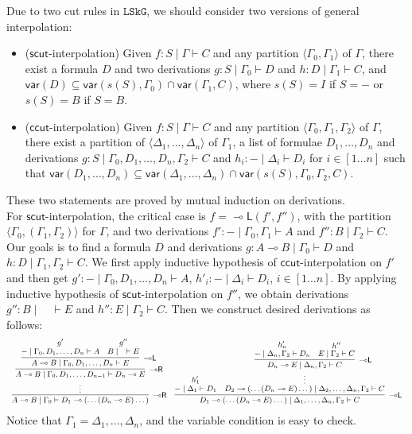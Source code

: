 \documentclass[submission,copyright,creativecommons]{eptcs}
\theoremstyle{definition}
\newcommand{\GG}{\Gamma}
\newcommand{\GD}{\Delta}
\newcommand{\lolli}{\multimap}
\newcommand{\lleft}{{\lolli}\mathsf{L}}
\newcommand{\lright}{{\lolli}\mathsf{R}}
\newcommand{\vdG}{\vdash}
\newcommand{\LSkG}{$\mathtt{LSkG}$}
\newcommand{\mf}[1]{\mathsf{#1}}
\newcommand{\vars}[1]{\mathsf{var}(#1)}
\begin{document}
Due to two cut rules in \LSkG, we should consider two versions of general interpolation:
\begin{itemize}
  \item[\ ] ($\mf{scut}$-interpolation) Given $f: S \mid \Gamma \vdG C$ and any partition $\langle \GG_0,\GG_1 \rangle$ of $\GG$, there exist a formula $D$ and two derivations $g : S \mid \GG_0 \vdG D$ and $h : D \mid \GG_1 \vdG C$, and $\vars{D} \subseteq \vars{s(S), \GG_0} \cap \vars{\GG_1, C}$, where $s(S) = I$ if $S = {-}$ or $s(S) = B$ if $S = B$.
  \item[\ ] ($\mf{ccut}$-interpolation) Given $f: S \mid \Gamma \vdG C$ and any partition $\langle \GG_0,\GG_1, \GG_2 \rangle$ of $\GG$, there exist a partition of $\langle \GD_1, \dots, \GD_n \rangle$ of $\GG_1$, a list of formulae $D_1, \dots, D_n$ and derivations $g: S \mid \GG_0, D_1, \dots, D_n, \GG_2 \vdG C$ and $h_i : {-} \mid \GD_i \vdG D_i$ for $i \in [1\dots n]$ such that $\vars{D_1, \dots, D_n} \subseteq \vars{\GD_1, \dots, \GD_n} \cap \vars{s(S), \GG_0, \GG_2, C}$.
\end{itemize}
These two statements are proved by mutual induction on derivations.
\\
For $\mf{scut}$-interpolation, the critical case is $f = \lleft (f',f'')$, with the partition $\langle \GG_0, (\GG_1, \GG_2) \rangle$ for $\GG$, and two derivations $f' : {-} \mid \GG_0, \GG_1 \vdG A$ and $f'': B \mid \GG_2 \vdG C$.
Our goals is to find a formula $D$ and derivations $g : A\lolli B \mid \GG_0 \vdG D$ and $h: D \mid \GG_1, \GG_2 \vdG C$.
We first apply inductive hypothesis of $\mf{ccut}$-interpolation on $f'$ and then get $g': {-} \mid \GG_0 , D_1, \dots, D_n \vdG A$, $h'_i : {-} \mid \GD_i \vdG D_i$, $i \in [1\dots n]$.
By applying inductive hypothesis of $\mf{scut}$-interpolation on $f''$, we obtain derivations $g'' : B \mid \quad \vdG E$ and $h'': E \mid \GG_2 \vdG C$.
Then we construct desired derivations as follows:
\begin{displaymath}
  \small\begin{array}{c}
    \infer[\lright]{A\lolli B \mid \GG_0 \vdG D_1 \lolli (\dots (D_n \lolli E)\dots)}{
      \deduce{\vdots}{
        \infer[\lright]{A \lolli B \mid \GG_0 , D_1, \dots ,D_{n-1} \vdG D_n \lolli E}{
        \infer[\lleft]{A \lolli B \mid \GG_0 , D_1, \dots, D_n \vdG E}{
          \deduce{{-} \mid \GG_0 , D_1, \dots, D_n \vdG A}{g'}
          &
          \deduce{B \mid \quad \vdG E}{g''}
        }
      }
      }
    }
    \quad
    \infer[\lleft]{D_1 \lolli (\dots (D_n \lolli E)\dots) \mid \GD_1, \dots, \GD_n, \GG_2 \vdG C}{
      \deduce{{-} \mid \GD_1 \vdG D_1}{h'_1}
      &
      \deduce{D_2 \lolli (\dots (D_n \lolli E)\dots) \mid \GD_2, \dots, \GD_n, \GG_2 \vdG C}{
        \deduce{\vdots}{
          \infer[\lleft]{D_n \lolli E \mid \GD_n, \GG_2 \vdG C}{
            \deduce{{-} \mid \GD_n, \GG_2 \vdG D_n}{h'_n}
            &
            \deduce{E \mid \GG_2 \vdG C}{h''}
          }
        }
      }
    }
  \end{array}
\end{displaymath}
Notice that $\GG_1 = \GD_1, \dots, \GD_n$, and the variable condition is easy to check.
\end{document}
